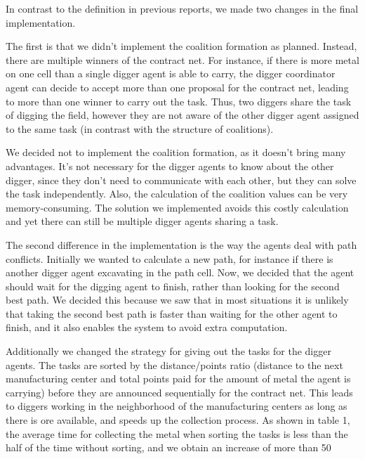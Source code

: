 In contrast to the definition in previous reports, we made two changes in the final implementation.

The first is that we didn’t implement the coalition formation as planned. Instead, there are multiple winners of the contract net. For instance, if there is more metal on one cell than a single digger agent is able to carry, the digger coordinator agent can decide to accept more than one proposal for the contract net, leading to more than one winner to carry out the task. Thus, two diggers share the task of digging the field, however they are not aware of the other digger agent assigned to the same task (in contrast with the structure of coalitions).

We decided not to implement the coalition formation, as it doesn’t bring many advantages.  It’s not necessary for the digger agents to know about the other digger, since they don’t need to communicate with each other, but they can solve the task independently. Also, the calculation of the coalition values can be very memory-consuming. The solution we implemented avoids this costly calculation and yet there can still be multiple digger agents sharing a task.

The second difference in the implementation is the way the agents deal with path conflicts. Initially we wanted to calculate a new path, for instance if there is another digger agent excavating in the path cell. Now, we decided that the agent should wait for the digging agent to finish, rather than looking for the second best path. We decided this because we saw that in most situations it is unlikely that taking the second best path is faster than waiting for the other agent to finish, and it also enables the system to avoid extra computation.

Additionally we changed the strategy for giving out the tasks for the digger agents. The tasks are sorted by the distance/points ratio (distance to the next manufacturing center and total points paid for the amount of metal the agent is carrying) before they are announced sequentially for the contract net. This leads to diggers working in the neighborhood of the manufacturing centers as long as there is ore available, and speeds up the collection process. As shown in table 1, the average time for collecting the metal when sorting the tasks is less than the half of the time without sorting, and we obtain an increase of more than 50%

